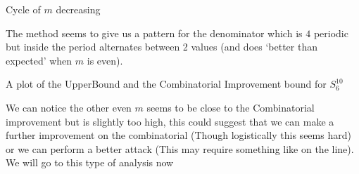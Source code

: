 \documentclass[a4paper,10pt]{article}
\theoremstyle{definition}
\theoremstyle{definition}
\theoremstyle{remark}
\theoremstyle{definition}
\begin{document}
\begin{myfigure}
\begin{center}
\end{center}
\caption{Cycle of $m$ decreasing}
\end{myfigure}

The method seems to give us a pattern for the denominator which is $4$ periodic but inside the period alternates between 2 values (and does `better than expected' when $m$ is even).

\begin{myfigure}
\begin{center}

\end{center}
\caption{A plot of the UpperBound and the Combinatorial Improvement bound for $S_{6}^{10}$}
\end{myfigure}

We can notice the other even $m$ seems to be close to the Combinatorial improvement but is slightly too high, this could suggest that we can make a further improvement on the combinatorial (Though logistically this seems hard) or we can perform a better attack (This may require something like on the line). We will go to this type of analysis now
\end{document}
